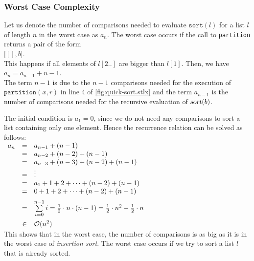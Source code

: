 \subsubsection{Worst Case Complexity}
Let us denote the number of comparisons needed to evaluate $\mathtt{sort}(l)$ for a list $l$ of
length $n$ in the worst case as $a_n$.  The worst case occurs if the call to \texttt{partition}
returns a pair of the form
\\[0.2cm]
\hspace*{1.3cm}
$\bigl[ [], b \bigr]$.
\\[0.2cm]
This happens if all elements of $l[2..]$ are bigger than $l[1]$.  Then, we have
\\[0.2cm]
\hspace*{1.3cm}
$a_n = a_{n-1} + n - 1$. 
\\[0.2cm]
The term $n-1$ is due to the $n-1$ comparisons needed for the execution of
$\texttt{partition}(x,r)$ in line 4 of \ref{fig:quick-sort.stlx} and the term $a_{n-1}$ is the
number of comparisons needed for the recursive evaluation of $\textsl{sort}(b)$.

The initial condition is $a_1 = 0$, since we do not need any comparisons to sort a list
containing only one element.
Hence the recurrence relation can be solved as follows:
\\[0.2cm]
\hspace*{1.3cm}
$
\begin{array}{lcl}
  a_n & = & a_{n-1} + (n-1) \\
      & = & a_{n-2} + (n-2) + (n-1) \\
      & = & a_{n-3} + (n-3) + (n-2) + (n-1) \\
      & = & \vdots \\
      & = & a_{1} + 1 + 2 + \cdots  + (n-2) + (n-1) \\
      & = & 0 + 1 + 2 + \cdots  + (n-2) + (n-1) \\[0.2cm]
      & = & \sum\limits_{i=0}^{n-1} i  =  \frac{1}{2} \cdot n \cdot(n - 1) =
            \frac{1}{2} \cdot n^2 - \frac{1}{2} \cdot n \\[0.4cm]
      & \in & \mathcal{O}(n^2)
\end{array}
$
\\[0.2cm]
This shows that in the worst case, the number of comparisons is as big as it is in the worst case of 
\emph{insertion sort}.  The worst case occurs if we try to sort a list $l$ that is already sorted.


